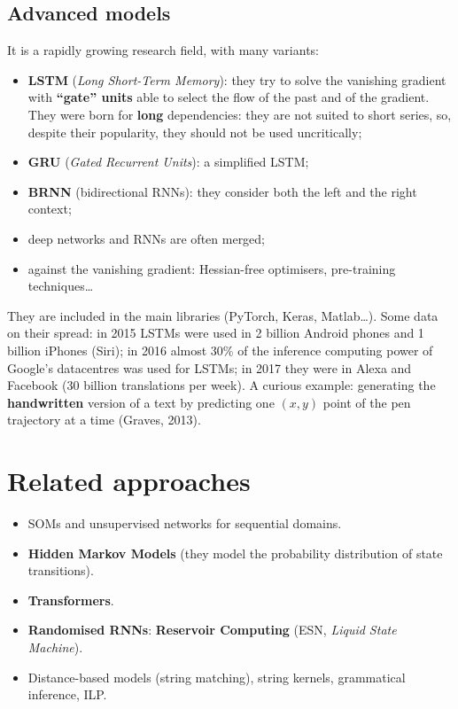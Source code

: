 \subsection{Advanced models}\label{modelli-avanzati}

It is a rapidly growing research field, with many variants:

\begin{itemize}
\tightlist
\item
  \textbf{LSTM} (\emph{Long Short-Term Memory}): they try to solve the
  vanishing gradient with \textbf{``gate'' units} able to select the
  flow of the past and of the gradient. They were born for
  \textbf{long} dependencies: they are not suited to short series, so,
  despite their popularity, they should not be used uncritically;
\item
  \textbf{GRU} (\emph{Gated Recurrent Units}): a simplified LSTM;
\item
  \textbf{BRNN} (bidirectional RNNs): they consider both the left and
  the right context;
\item
  deep networks and RNNs are often merged;
\item
  against the vanishing gradient: Hessian-free optimisers, pre-training
  techniques\ldots{}
\end{itemize}

They are included in the main libraries (PyTorch, Keras,
Matlab\ldots). Some data on their spread: in 2015 LSTMs were used in 2
billion Android phones and 1 billion iPhones (Siri); in 2016 almost
30\% of the inference computing power of Google's datacentres was used
for LSTMs; in 2017 they were in Alexa and Facebook (30 billion
translations per week). A curious example: generating the
\textbf{handwritten} version of a text by predicting one \((x,y)\) point
of the pen trajectory at a time (Graves, 2013).

\section{Related approaches}\label{approcci-collegati}

\begin{itemize}
\tightlist
\item
  SOMs and unsupervised networks for sequential domains.
\item
  \textbf{Hidden Markov Models} (they model the probability
  distribution of state transitions).
\item
  \textbf{Transformers}.
\item
  \textbf{Randomised RNNs}: \textbf{Reservoir Computing} (ESN,
  \emph{Liquid State Machine}).
\item
  Distance-based models (string matching), string kernels, grammatical
  inference, ILP.
\end{itemize}

